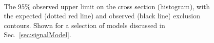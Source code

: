 \begin{figure}[h!]
\begin{center}
    \label{fig:T2bb}
     ~~
    \label{fig:T1bbbb}
     \\
    \caption{
      The 95\% observed upper limit on the cross section (histogram),
      with the expected (dotted red line) and observed (black line)
      exclusion contours. Shown for a selection of \SUSY models discussed in
      Sec.~\ref{sec:signalModel}.
    }
    \label{fig:T1tttt}
  \end{center}
\end{figure}


